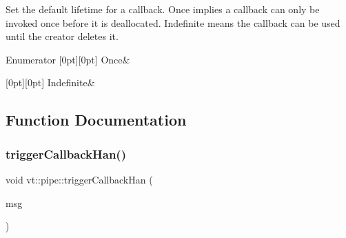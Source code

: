 Set the default lifetime for a callback. Once implies a callback can only be invoked once before it is deallocated. Indefinite means the callback can be used until the creator deletes it. 

\begin{DoxyEnumFields}{Enumerator}
[0pt][0pt]{}\mbox{\label{namespacevt_1_1pipe_acb42b284378c0fdac1d7c6335dc26f58ae1a9dc9f23534e63de9df0d540ac1611}} 
Once&\\
\hline

[0pt][0pt]{}\mbox{\label{namespacevt_1_1pipe_acb42b284378c0fdac1d7c6335dc26f58af55dbf14245df4e3c834b3edd8495b52}} 
Indefinite&\\
\hline

\end{DoxyEnumFields}


\subsection{Function Documentation}
\mbox{\label{namespacevt_1_1pipe_af259c91e50470478594f47b11a8ecb88}} 
\subsubsection{\texorpdfstring{trigger\+Callback\+Han()}{triggerCallbackHan()}}
{\footnotesize\ttfamily void vt\+::pipe\+::trigger\+Callback\+Han (\begin{DoxyParamCaption}\item[{\hyperlink{structvt_1_1pipe_1_1_callback_msg}{Callback\+Msg} $\ast$}]{msg }\end{DoxyParamCaption})}

\mbox{\label{namespacevt_1_1pipe_a8be489288c5586b4a4d0daad173bc357}} 
